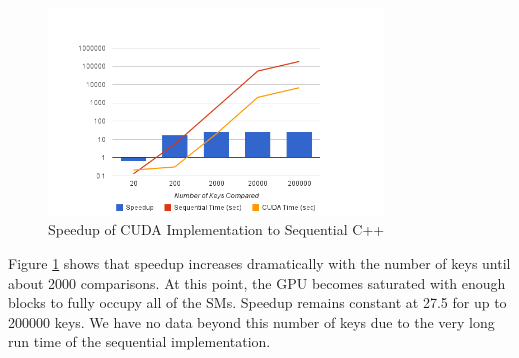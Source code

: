 \documentclass[12pt]{ucthesis}
\begin{document}
\begin{figure}
   \label{fig:speedup}
   \centering
   \includegraphics[width=3.5in]{chart_1.png}
   \caption{Speedup of CUDA Implementation to Sequential C++}
\end{figure}

Figure \ref{fig:speedup} shows that speedup increases dramatically with 
the number of keys until about 2000 comparisons. At this point, the GPU
becomes saturated with enough blocks to fully occupy all of the SMs. Speedup
remains constant at 27.5 for up to 200000 keys. We have no data beyond this
number of keys due to the very long run time of the sequential implementation. 

%

\end{document}
